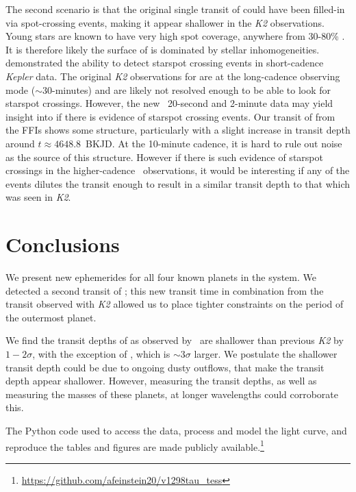 \documentclass[twocolumn]{aastex631}
\begin{document}
The second scenario is that the original single transit of \planete could have been filled-in via spot-crossing events, making it appear shallower in the \textit{K2} observations. Young stars are known to have very high spot coverage, anywhere from 30-80\% \citep[][]{grankin99, gully17, feinstein20}. It is therefore likely the surface of \sname is dominated by stellar inhomogeneities. \cite{morris17} demonstrated the ability to detect starspot crossing events in short-cadence \textit{Kepler} data. The original \textit{K2} observations for \sname are at the long-cadence observing mode ($\sim 30$-minutes) and are likely not resolved enough to be able to look for starspot crossings. However, the new \tess\ 20-second and 2-minute data may yield insight into if there is evidence of starspot crossing events. Our transit of \planete from the FFIs shows some structure, particularly with a slight increase in transit depth around $t \approx 4648.8$~BKJD. At the 10-minute cadence, it is hard to rule out noise as the source of this structure. However if there is such evidence of starspot crossings in the higher-cadence \tess\ observations, it would be interesting if any of the events dilutes the transit enough to result in a similar transit depth to that which was seen in \textit{K2}. 


\section{Conclusions} \label{sec:conclusions}

We present new ephemerides for all four known planets in the \sname system. We detected a second transit of \planete; this new transit time in combination from the transit observed with \textit{K2} allowed us to place tighter constraints on the period of the outermost planet.

We find the transit depths of \planetknown as observed by \tess\ are shallower than previous \textit{K2} by $1-2\sigma$, with the exception of \planete, which is $\sim 3\sigma$ larger. We postulate the shallower transit depth could be due to ongoing dusty outflows, that make the transit depth appear shallower. However, measuring the transit depths, as well as measuring the masses of these planets, at longer wavelengths could corroborate this.

The Python code used to access the data, process and model the light curve, and reproduce the tables and figures are made publicly available.\footnote{\url{https://github.com/afeinstein20/v1298tau_tess}}
\end{document}

